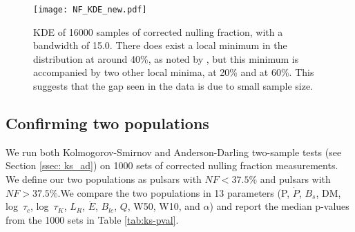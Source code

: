 \documentclass[fleqn,usenatbib]{mnras}
\begin{document}
\begin{figure} 
    \centering
    \texttt{[image: NF\_KDE\_new.pdf]}
    \caption{KDE of 16000 samples of corrected nulling fraction, with a bandwidth of 15.0. There does exist a local minimum in the distribution at around 40\%, as noted by \citet{Konar2019}, but this minimum is accompanied by two other local minima, at 20\% and at 60\%. This suggests that the gap seen in the data is due to small sample size.}
    \label{fig:kde}
\end{figure}


\subsection{Confirming two populations}
\label{ssec: confirming_two_pops}

We run both Kolmogorov-Smirnov and Anderson-Darling two-sample tests (see Section \ref{ssec: ks_ad}) on 1000 sets of corrected nulling fraction measurements. We define our two populations as pulsars with $NF<37.5\%$ and pulsars with $NF>37.5\%$.We compare the two populations in 13 parameters (P, $\dot{P}$, $B_s$, DM, log~$\tau_c$, log~$\tau_K$, $L_R$, $\dot{E}$, $B_{lc}$, $Q$, W50, W10, and $\alpha$) and report the median p-values from the 1000 sets in Table \ref{tab:ks-pval}.
\end{document}
